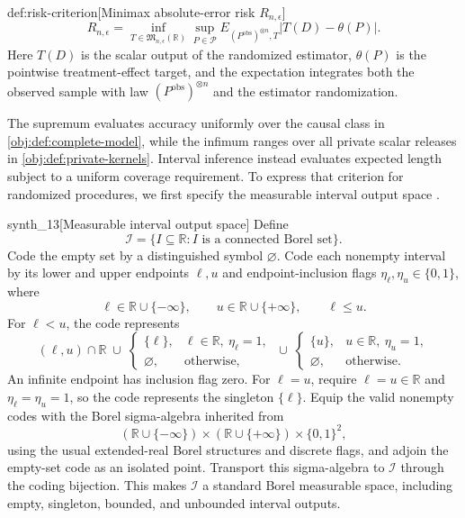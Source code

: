 \documentclass[11pt]{article}
\begin{document}
\begin{definitionv}{def:risk-criterion}[Minimax absolute-error risk \(R_{n,\epsilon}\)]
\[
R_{n,\epsilon}
=
\inf_{T\in\mathfrak M_{n,\epsilon}(\mathbb R)}
\sup_{P\in\mathcal P}
E_{(P^{\mathrm{obs}})^{\otimes n},T}
\bigl|T(D)-\theta(P)\bigr|.
\]
Here \(T(D)\) is the scalar output of the randomized estimator, \(\theta(P)\) is the pointwise treatment-effect target, and the expectation integrates both the observed sample with law \((P^{\mathrm{obs}})^{\otimes n}\) and the estimator randomization.
\end{definitionv}

The supremum evaluates accuracy uniformly over the causal class in \cref{obj:def:complete-model}, while the infimum ranges over all private scalar releases in \cref{obj:def:private-kernels}. Interval inference instead evaluates expected length subject to a uniform coverage requirement. To express that criterion for randomized procedures, we first specify the measurable interval output space .

\begin{definitionv}{synth_13}[Measurable interval output space]
Define
\[
\mathcal I=\{I\subseteq\mathbb R:I\text{ is a connected Borel set}\}.
\]
Code the empty set by a distinguished symbol \(\varnothing\). Code each nonempty interval by its lower and upper endpoints \(\ell,u\) and endpoint-inclusion flags \(\eta_\ell,\eta_u\in\{0,1\}\), where
\[
\ell\in\mathbb R\cup\{-\infty\},\qquad
u\in\mathbb R\cup\{+\infty\},\qquad \ell\le u.
\]
For \(\ell<u\), the code represents
\[
(\ell,u)\cap\mathbb R
\;\cup\;
\begin{cases}\{\ell\},&\ell\in\mathbb R,\ \eta_\ell=1,\\ \varnothing,&\text{otherwise},\end{cases}
\;\cup\;
\begin{cases}\{u\},&u\in\mathbb R,\ \eta_u=1,\\ \varnothing,&\text{otherwise}.\end{cases}
\]
An infinite endpoint has inclusion flag zero. For \(\ell=u\), require \(\ell=u\in\mathbb R\) and \(\eta_\ell=\eta_u=1\), so the code represents the singleton \(\{\ell\}\). Equip the valid nonempty codes with the Borel sigma-algebra inherited from
\[
(\mathbb R\cup\{-\infty\})\times
(\mathbb R\cup\{+\infty\})\times\{0,1\}^2,
\]
using the usual extended-real Borel structures and discrete flags, and adjoin the empty-set code as an isolated point. Transport this sigma-algebra to \(\mathcal I\) through the coding bijection. This makes \(\mathcal I\) a standard Borel measurable space, including empty, singleton, bounded, and unbounded interval outputs.
\end{definitionv}
\end{document}
